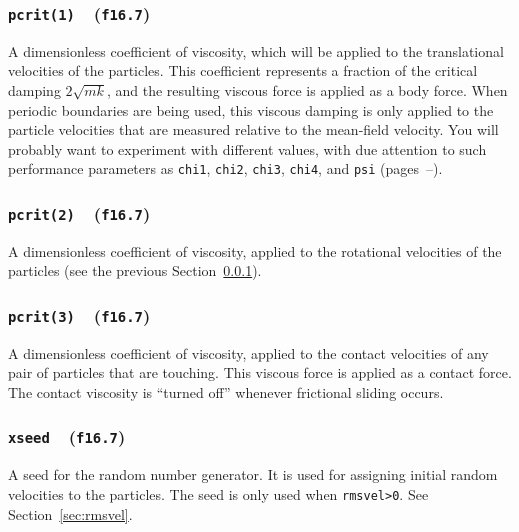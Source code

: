 \documentclass[letterpaper,11pt]{article}
\newcommand{\Var}[2]{\texttt{#1}\ \  (\texttt{#2})}
\begin{document}
\subsubsection[\texttt{pcrit(1)}]{\Var{pcrit(1)}{f16.7}}\label{sec:pcrit1}
A dimensionless coefficient of viscosity, which will be applied to the
translational velocities of the particles.
This coefficient represents a fraction of the critical damping
$2\sqrt{mk}$, and the resulting viscous force is applied as a body force.
When periodic boundaries are being used, this viscous damping is only
applied to the particle velocities that are measured relative to the
mean-field velocity.
You will probably want to experiment with different values, with
due attention to such performance parameters as \texttt{chi1},
\texttt{chi2}, \texttt{chi3}, \texttt{chi4}, and \texttt{psi}
(pages~\pageref{sec:chi1}--\pageref{sec:chi4}).
\subsubsection[\texttt{pcrit(2)}]{\Var{pcrit(2)}{f16.7}}\label{sec:pcrit2}
A dimensionless coefficient of viscosity, applied to the rotational
velocities of the particles (see the previous Section~\ref{sec:pcrit1}).
\subsubsection[\texttt{pcrit(3)}]{\Var{pcrit(3)}{f16.7}}\label{sec:pcrit3}
A dimensionless coefficient of viscosity, applied to the 
contact velocities of any pair of particles
that are touching.  This viscous force is
applied as a contact force.
The contact viscosity is ``turned off'' whenever frictional sliding occurs.
\subsubsection[\texttt{xseed}]{\Var{xseed}{f16.7}}\label{sec:xseed}
A seed for the random number generator. 
It is used for assigning
initial random velocities to the particles.
The seed is only used when \mbox{\texttt{rmsvel>0}}.
See Section~\ref{sec:rmsvel}.
%
\end{document}
